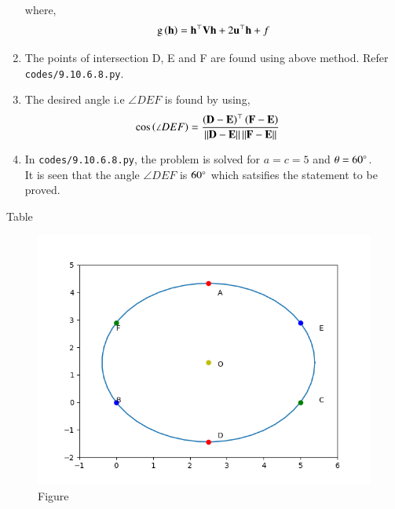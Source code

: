 \documentclass[journal,12pt,twocolumn]{IEEEtran}
\begin{document}
\begin{enumerate}
where,
\begin{align}
        \text{g}\left(\mathbf{h}\right) = \mathbf{h}^{\top}\mathbf{V}\mathbf{h} + 2\mathbf{u}^{\top}\mathbf{h} +f
\end{align}

\item The points of intersection D, E and F are found using above method. Refer \texttt{codes/9.10.6.8.py}.

\item The desired angle i.e $\angle DEF$ is found by using,
	\begin{align}
		\cos\left(\angle DEF\right) &= \frac{ \left(\mathbf{D}-\mathbf{E}\right)^{\top} \left( \mathbf{F}-\mathbf{E}\right) } { \left\lVert\mathbf{D}-\mathbf{E}\right\rVert \left\lVert\mathbf{F}-\mathbf{E}\right\rVert }
	\end{align}

\item In \texttt{codes/9.10.6.8.py}, the problem is solved for $a =c = 5$ and $ \theta = 60 \degree$.\\
	It is seen that the angle $\angle DEF$ is $ 60 \degree$ which satsifies the statement to be proved.
\end{enumerate}

\begin{table}[h!]
\centering
        
        \caption{Table}
        \label{tab:}
\end{table}

\begin{figure}[h!]
  \centering
   \includegraphics[width=\linewidth,height = \linewidth]{figs/Figure_1.png}
   \caption{Figure}
   \label{fig:}
\end{figure}
\end{document}
